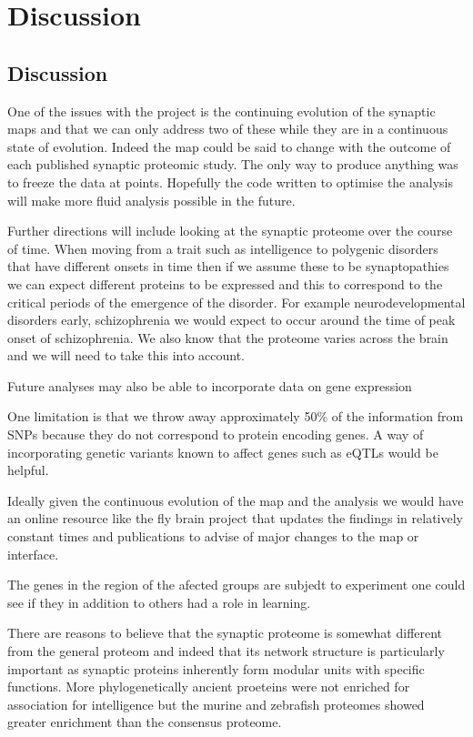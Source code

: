 \chapter{Discussion}

\section{Discussion}
One of the issues with the project is the continuing evolution of the synaptic maps and that we can only address two of these while they are in a continuous state of evolution. Indeed the map could be said to change with the outcome of each published synaptic proteomic study. The only way to produce anything was to freeze the data at points. Hopefully the code written to optimise the analysis will make more fluid analysis possible in the future.

Further directions will include looking at the synaptic proteome over the course of time. When moving from a trait such as intelligence to polygenic disorders that have different onsets in time then if we assume these to be synaptopathies we can expect different proteins to be expressed and this to correspond to the critical periods of the emergence of the disorder. For example neurodevelopmental disorders early, schizophrenia we would expect to occur around the time of peak onset of schizophrenia. We also know that the proteome varies across the brain and we will need to take this into account.

Future analyses may also be able to incorporate data on gene expression

One limitation is that we throw away approximately 50\% of the information from SNPs because they do not correspond to protein encoding genes. A way of incorporating genetic variants known to affect genes such as eQTLs would be helpful. 

Ideally given the continuous evolution of the map and the analysis we would have an online resource like the fly brain project that updates the findings in relatively constant times and publications to advise of major changes to the map or interface. 

The genes in the region of the afected groups are subjedt to experiment one could see if they in addition to others had a role in learning.

There are reasons to believe that the synaptic proteome is somewhat different from the general proteom and indeed that its network structure is particularly important as synaptic proteins inherently form modular units with specific functions. More phylogenetically ancient proeteins were not enriched for association for intelligence but the murine and zebrafish proteomes showed greater enrichment than the consensus proteome.

